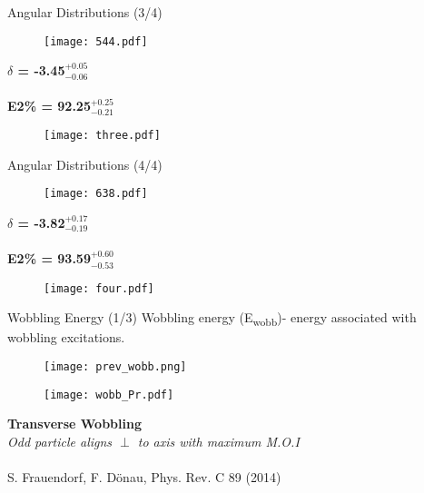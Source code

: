 \documentclass [aspectratio=169]{beamer}
\begin{document}
\begin{frame}{Angular Distributions (3/4)}
\begin{center}
\begin{multicols}{2}
\begin{figure}
\texttt{[image: 544.pdf]}
\end{figure}
\textbf{$\delta$ = -3.45$^{+0.05}_{-0.06}$ \\~\\
E2\% = 92.25$^{+0.25}_{-0.21}$} \\
\begin{figure}
\texttt{[image: three.pdf]}
\end{figure}
\end{multicols}
\end{center}
\end{frame}


\begin{frame}{Angular Distributions (4/4)}
\begin{center}
\begin{multicols}{2}
\begin{figure}
\texttt{[image: 638.pdf]}
\end{figure}
\textbf{$\delta$ = -3.82$^{+0.17}_{-0.19}$ \\~\\
E2\% = 93.59$^{+0.60}_{-0.53}$} \\
\begin{figure}
\texttt{[image: four.pdf]}
\end{figure}
\end{multicols}
\end{center}
\end{frame}


\begin{frame}{Wobbling Energy (1/3)}
Wobbling energy (E\textsubscript{wobb})- energy associated with wobbling excitations.
\begin{multicols}{2}
\begin{figure}
\texttt{[image: prev\_wobb.png]}
\end{figure}
\begin{center}
\begin{figure}
\texttt{[image: wobb\_Pr.pdf]}
\end{figure}
\textbf{Transverse Wobbling}\\
\textit{Odd particle aligns $\perp$ to axis with maximum M.O.I}\\~\\
\scriptsize{\color{violet}S. Frauendorf, F. D{\"o}nau, Phys. Rev. C 89 (2014)}
\end{center}
\end{multicols}
\end{frame}
\end{document}

